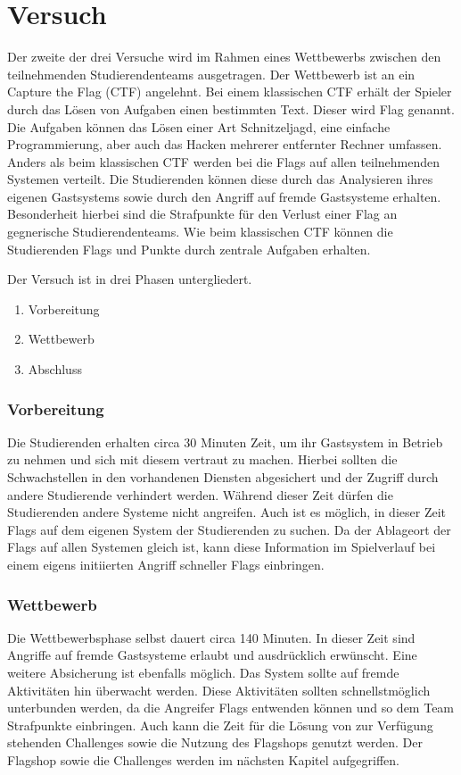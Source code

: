 \section{Versuch }
\label{sec:Versuch}

Der zweite der drei Versuche  wird im Rahmen eines Wettbewerbs zwischen den teilnehmenden Studierendenteams ausgetragen. Der Wettbewerb ist an ein Capture the Flag (CTF) angelehnt. Bei einem klassischen CTF erhält der Spieler durch das Lösen von Aufgaben einen bestimmten Text. Dieser wird Flag genannt. Die Aufgaben können das Lösen einer Art Schnitzeljagd, eine einfache Programmierung, aber auch das Hacken mehrerer entfernter Rechner umfassen. Anders als beim klassischen CTF werden bei  die Flags auf allen teilnehmenden Systemen verteilt. \cite{tanWhatCTFHow2020} Die Studierenden können diese durch das Analysieren ihres eigenen Gastsystems sowie durch den Angriff auf fremde Gastsysteme erhalten. Besonderheit hierbei sind die Strafpunkte für den Verlust einer Flag an gegnerische Studierendenteams. Wie beim klassischen CTF können die Studierenden Flags und Punkte durch zentrale Aufgaben erhalten.

Der Versuch ist in drei Phasen untergliedert.
\begin{enumerate}
	\item Vorbereitung
	\item Wettbewerb
	\item Abschluss
\end{enumerate}

\subsubsection{Vorbereitung}
Die Studierenden erhalten circa 30 Minuten Zeit, um ihr Gastsystem in Betrieb zu nehmen und sich mit diesem vertraut zu machen. Hierbei sollten die Schwachstellen in den vorhandenen Diensten abgesichert und der Zugriff durch andere Studierende verhindert werden. Während dieser Zeit dürfen die Studierenden andere Systeme nicht angreifen. Auch ist es möglich, in dieser Zeit Flags auf dem eigenen System der Studierenden zu suchen. Da der Ablageort der Flags auf allen Systemen gleich ist, kann diese Information im Spielverlauf bei einem eigens initiierten Angriff schneller Flags einbringen.

\subsubsection{Wettbewerb}
Die Wettbewerbsphase selbst dauert circa 140 Minuten. In dieser Zeit sind Angriffe auf fremde Gastsysteme erlaubt und ausdrücklich erwünscht. Eine weitere Absicherung ist ebenfalls möglich. Das System sollte auf fremde Aktivitäten hin überwacht werden. Diese Aktivitäten sollten schnellstmöglich unterbunden werden, da die Angreifer Flags entwenden können und so dem Team Strafpunkte einbringen. Auch kann die Zeit für die Lösung von zur Verfügung stehenden Challenges sowie die Nutzung des Flagshops genutzt werden. Der Flagshop sowie die Challenges werden im nächsten Kapitel aufgegriffen.

